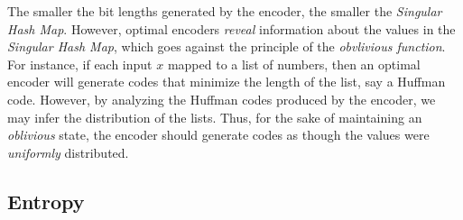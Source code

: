 \documentclass[ ../main.tex]{subfiles}
\begin{document}
The smaller the bit lengths generated by the encoder, the smaller the \emph{Singular Hash Map}.
However, optimal encoders \emph{reveal} information about the values in the \emph{Singular Hash Map}, which goes against the principle of the \emph{obvlivious function}.
For instance, if each input $x$ mapped to a list of numbers, then an optimal encoder will generate codes that minimize the length of the list, say a Huffman code.
However, by analyzing the Huffman codes produced by the encoder, we may infer the distribution of the lists.
Thus, for the sake of maintaining an \emph{oblivious} state, the encoder should generate codes as though the values were \emph{uniformly} distributed.

\subsection{Entropy}
\end{document}
